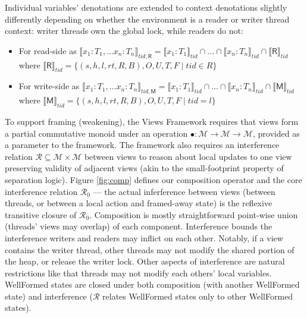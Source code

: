 Individual variables' denotations are extended to context denotations slightly differently depending on whether the environment is a reader or writer thread context: writer threads own the global lock, while readers do not:
\begin{itemize}
\item For read-side as $\llbracket x_1 : T_1, \ldots x_n : T_n \rrbracket_{tid,\textsf{R}} = \llbracket x_1 : T_1 \rrbracket_{tid} \cap \ldots \cap \llbracket x_n : T_n \rrbracket_{tid} \cap \llbracket \textsf{R} \rrbracket_{tid}$ where
$\llbracket \textsf{R} \rrbracket_{tid} = \{ (s,h,l,rt,R,B),O,U,T,F  \mid tid \in R \}$

\item For write-side as $\llbracket x_1 : T_1, \ldots x_n : T_n \rrbracket_{tid,\textsf{M}} = \llbracket x_1 : T_1 \rrbracket_{tid} \cap \ldots \cap \llbracket x_n : T_n \rrbracket_{tid} \cap \llbracket \textsf{M} \rrbracket_{tid}$ where
$\llbracket \textsf{M} \rrbracket_{tid} = \{ (s,h,l,rt,R,B),O,U,T,F  \mid tid = l \}$
%
\end{itemize}

To support framing (weakening), the Views Framework requires that views form a partial commutative monoid under an operation $\bullet : \mathcal{M} \longrightarrow \mathcal{M} \longrightarrow \mathcal{M}$, provided as a parameter to the framework.
The framework also requires an interference relation $\mathcal{R}\subseteq\mathcal{M}\times\mathcal{M}$ between views to reason about local updates to one view preserving validity of adjacent views (akin to the small-footprint property of separation logic).
Figure \ref{fig:comp} defines our composition operator and the core interference relation $\mathcal{R}_0$ --- the actual inferference between views (between threads, or between a local action and framed-away state) is the reflexive transitive closure of $\mathcal{R}_0$.
Composition is mostly straightforward point-wise union (threads' views may overlap) of each component.
Interference bounds the interference writers and readers may inflict on each other.  Notably, if a view contains the writer thread, other threads may not modify the shared portion of the heap, or release the writer lock.  Other aspects of interference are natural restrictions like that threads may not modify each others' local variables.
\textsf{WellFormed} states are closed under both composition (with another \textsf{WellFormed} state) and interference ($\mathcal{R}$ relates \textsf{WellFormed} states only to other \textsf{WellFormed} states).



